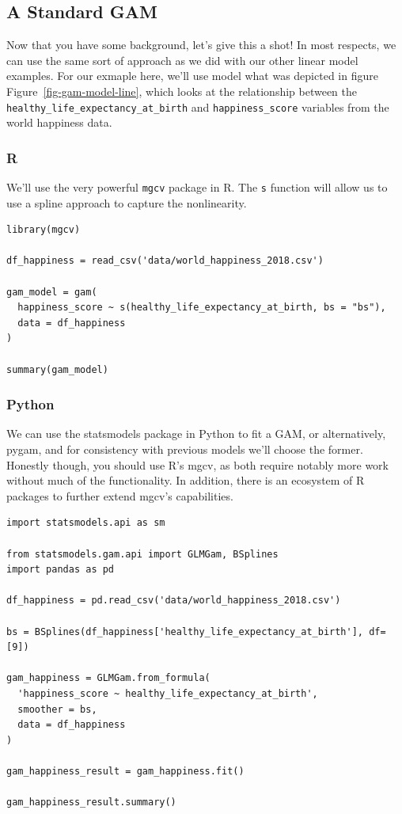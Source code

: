 \documentclass[
  letterpaper,
]{krantz}
\begin{document}
\subsection{A Standard GAM}\label{sec-gam-standard}

Now that you have some background, let's give this a shot! In most
respects, we can use the same sort of approach as we did with our other
linear model examples. For our exmaple here, we'll use model what was
depicted in figure Figure~\ref{fig-gam-model-line}, which looks at the
relationship between the \texttt{healthy\_life\_expectancy\_at\_birth}
and \texttt{happiness\_score} variables from the world happiness data.

\subsubsection{R}

We'll use the very powerful \texttt{mgcv} package in R. The \texttt{s}
function will allow us to use a spline approach to capture the
nonlinearity.

\begin{verbatim}
library(mgcv)

df_happiness = read_csv('data/world_happiness_2018.csv')

gam_model = gam(
  happiness_score ~ s(healthy_life_expectancy_at_birth, bs = "bs"), 
  data = df_happiness
)

summary(gam_model)
\end{verbatim}

\subsubsection{Python}

We can use the {statsmodels} package in Python to fit a GAM, or
alternatively, {pygam}, and for consistency with previous models we'll
choose the former. Honestly though, you should use R's {mgcv}, as both
require notably more work without much of the functionality. In
addition, there is an ecosystem of R packages to further extend {mgcv's}
capabilities.

\begin{verbatim}
import statsmodels.api as sm

from statsmodels.gam.api import GLMGam, BSplines
import pandas as pd

df_happiness = pd.read_csv('data/world_happiness_2018.csv')

bs = BSplines(df_happiness['healthy_life_expectancy_at_birth'], df=[9])

gam_happiness = GLMGam.from_formula(
  'happiness_score ~ healthy_life_expectancy_at_birth', 
  smoother = bs,
  data = df_happiness
)
  
gam_happiness_result = gam_happiness.fit()

gam_happiness_result.summary()
\end{verbatim}
\end{document}
